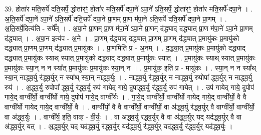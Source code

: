 \documentclass[17pt]{extarticle}
\begin{document}
39. होता॑र मति॒सर्पे॑ दति॒सर्पे॒ द्धोता॑रꣳ॒॒ होता॑र मति॒सर्पे॑ दपा॒ने॑ ऽपा॒ने॑ ऽति॒सर्पे॒ द्धोता॑रꣳ॒॒ होता॑र मति॒सर्पे॑-दपा॒ने । . अ॒ति॒सर्पे॑ दपा॒ने॑ ऽपा॒ने॑ ऽति॒सर्पे॑ दति॒सर्पे॑ दपा॒ने प्रा॒णम् प्रा॒ण म॑पा॒ने॑ ऽति॒सर्पे॑ दति॒सर्पे॑ दपा॒ने प्रा॒णम् । . अ॒ति॒सर्पे॒दित्य॑ति - सर्पे᳚त् । . अ॒पा॒ने प्रा॒णम् प्रा॒ण म॑पा॒ने॑ ऽपा॒ने प्रा॒णम् द॑द्ध्याद् दद्ध्यात् प्रा॒ण म॑पा॒ने॑ ऽपा॒ने प्रा॒णम् द॑द्ध्यात् । . अ॒पा॒न इत्य॑प - अ॒ने । . प्रा॒णम् द॑द्ध्याद् दद्ध्यात् प्रा॒णम् प्रा॒णम् द॑द्ध्यात् प्र॒मायु॑कः प्र॒मायु॑को दद्ध्यात् प्रा॒णम् प्रा॒णम् द॑द्ध्यात् प्र॒मायु॑कः । . प्रा॒णमिति॑ प्र - अ॒नम् । . द॒द्ध्या॒त् प्र॒मायु॑कः प्र॒मायु॑को दद्ध्याद् दद्ध्यात् प्र॒मायु॑कः स्याथ् स्यात् प्र॒मायु॑को दद्ध्याद् दद्ध्यात् प्र॒मायु॑कः स्यात् । . प्र॒मायु॑कः स्याथ् स्यात् प्र॒मायु॑कः प्र॒मायु॑कः स्या॒न् न न स्या᳚त् प्र॒मायु॑कः प्र॒मायु॑कः स्या॒न् न । . प्र॒मायु॑क॒ इति॑ प्र - मायु॑कः । . स्या॒न् न न स्या᳚थ् स्या॒न् नाद्ध्व॒र्यु र॑द्ध्व॒र्युर् न स्या᳚थ् स्या॒न् नाद्ध्व॒र्युः । . नाद्ध्व॒र्यु र॑द्ध्व॒र्युर् न नाद्ध्व॒र्यु रुपोपा᳚ द्ध्व॒र्युर् न नाद्ध्व॒र्यु रुप॑ । . अ॒द्ध्व॒र्यु रुपोपा᳚ द्ध्व॒र्यु र॑द्ध्व॒र्यु रुप॑ गायेद् गाये॒ दुपा᳚द्ध्व॒र्यु र॑द्ध्व॒र्यु रुप॑ गायेत् । . उप॑ गायेद् गाये॒ दुपोप॑ गाये॒द् वाग्वी᳚र्यो॒ वाग्वी᳚र्यो गाये॒ दुपोप॑ गाये॒द् वाग्वी᳚र्यः । . गा॒ये॒द् वाग्वी᳚र्यो॒ वाग्वी᳚र्यो गायेद् गाये॒द् वाग्वी᳚र्यो॒ वै वै वाग्वी᳚र्यो गायेद् गाये॒द् वाग्वी᳚र्यो॒ वै । . वाग्वी᳚र्यो॒ वै वै वाग्वी᳚र्यो॒ वाग्वी᳚र्यो॒ वा अ॑द्ध्व॒र्यु र॑द्ध्व॒र्युर् वै वाग्वी᳚र्यो॒ वाग्वी᳚र्यो॒ वा अ॑द्ध्व॒र्युः । . वाग्वी᳚र्य॒ इति॒ वाक् - वी॒र्यः॒ । . वा अ॑द्ध्व॒र्यु र॑द्ध्व॒र्युर् वै वा अ॑द्ध्व॒र्युर् यद् यद॑द्ध्व॒र्युर् वै वा अ॑द्ध्व॒र्युर् यत् । . अ॒द्ध्व॒र्युर् यद् यद॑द्ध्व॒र्यु र॑द्ध्व॒र्युर् यद॑द्ध्व॒र्यु र॑द्ध्व॒र्युर् यद॑द्ध्व॒र्यु र॑द्ध्व॒र्युर् यद॑द्ध्व॒र्युः । \newline
\end{document}
